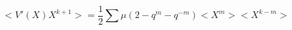 \begin{equation}
<V'(X) X^{k+1}> = \frac 12 \sum \mu ( 2-q^m -q^{-m}) <X^m><X^{k-m}>
\end{equation}

